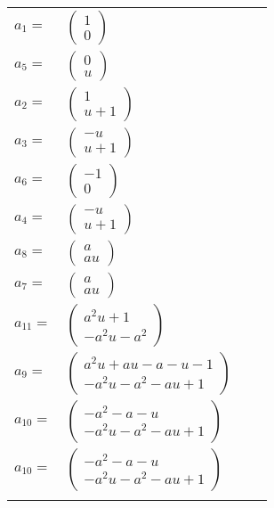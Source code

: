 \documentclass[1p]{elsarticle_modified}
\theoremstyle{definition}
\begin{document}
\begin{tabular}{m{7pt} m{180pt} m{7pt} m{180pt} }
\flushright $a_{1}=$&$\begin{pmatrix}1\\0\end{pmatrix}$ \\
\flushright $a_{5}=$&$\begin{pmatrix}0\\u\end{pmatrix}$ \\
\flushright $a_{2}=$&$\begin{pmatrix}1\\u+1\end{pmatrix}$ \\
\flushright $a_{3}=$&$\begin{pmatrix}- u\\u+1\end{pmatrix}$ \\
\flushright $a_{6}=$&$\begin{pmatrix}-1\\0\end{pmatrix}$ \\
\flushright $a_{4}=$&$\begin{pmatrix}- u\\u+1\end{pmatrix}$ \\
\flushright $a_{8}=$&$\begin{pmatrix}a\\a u\end{pmatrix}$ \\
\flushright $a_{7}=$&$\begin{pmatrix}a\\a u\end{pmatrix}$ \\
\flushright $a_{11}=$&$\begin{pmatrix}a^2 u+1\\- a^2 u- a^2\end{pmatrix}$ \\
\flushright $a_{9}=$&$\begin{pmatrix}a^2 u+a u- a- u-1\\- a^2 u- a^2- a u+1\end{pmatrix}$ \\
\flushright $a_{10}=$&$\begin{pmatrix}- a^2- a- u\\- a^2 u- a^2- a u+1\end{pmatrix}$\\ \flushright $a_{10}=$&$\begin{pmatrix}- a^2- a- u\\- a^2 u- a^2- a u+1\end{pmatrix}$\\&\end{tabular}
\end{document}
